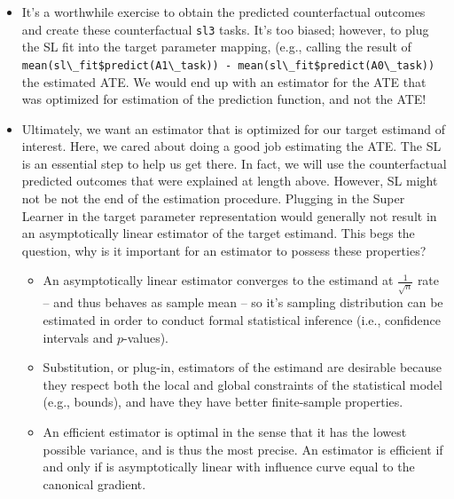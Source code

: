 \documentclass[
  12pt, krantz2,
]{book}
\newcommand{\passthrough}[1]{#1}
\theoremstyle{definition}
\theoremstyle{definition}
\theoremstyle{definition}
\newcommand{\1}{\mathbbm{1}}
\begin{document}
\begin{itemize}
\item
  It's a worthwhile exercise to obtain the predicted counterfactual outcomes
  and create these counterfactual \passthrough{\lstinline!sl3!} tasks. It's too biased; however, to
  plug the SL fit into the target parameter mapping, (e.g., calling the result
  of \passthrough{\lstinline!mean(sl\_fit$predict(A1\_task)) - mean(sl\_fit$predict(A0\_task))!} the
  estimated ATE. We would end up with an estimator for the ATE that was
  optimized for estimation of the prediction function, and not the ATE!
\item
  Ultimately, we want an estimator that is optimized for our target estimand of
  interest. Here, we cared about doing a good job estimating the ATE. The
  SL is an essential step to help us get there. In fact, we will use the
  counterfactual predicted outcomes that were explained at length above.
  However, SL might not be not the end of the estimation procedure.
  Plugging in the Super Learner in the target parameter representation would
  generally not result in an asymptotically linear estimator of the target
  estimand. This begs the question, why is it important for an estimator to
  possess these properties?

  \begin{itemize}
  \item
    An asymptotically linear estimator converges to the estimand at
    \(\frac{1}{\sqrt{n}}\) rate -- and thus behaves as sample mean -- so it's
    sampling distribution can be estimated in order to conduct formal
    statistical inference (i.e., confidence intervals and \(p\)-values).
  \item
    Substitution, or plug-in, estimators of the estimand are desirable because
    they respect both the local and global constraints of the statistical model
    (e.g., bounds), and have they have better finite-sample properties.
  \item
    An efficient estimator is optimal in the sense that it has the lowest
    possible variance, and is thus the most precise. An estimator is efficient
    if and only if is asymptotically linear with influence curve equal to the
    canonical gradient.


\end{itemize}
\end{itemize}
\end{document}
